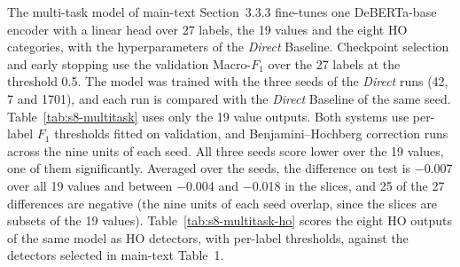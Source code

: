The multi-task model of main-text Section~3.3.3 fine-tunes one DeBERTa-base encoder with a linear head over 27 labels, the 19 values and the eight HO categories, with the hyperparameters of the \emph{Direct} Baseline. Checkpoint selection and early stopping use the validation Macro-$F_1$ over the 27 labels at the threshold 0.5. The model was trained with the three seeds of the \emph{Direct} runs (42, 7 and 1701), and each run is compared with the \emph{Direct} Baseline of the same seed. Table~\ref{tab:s8-multitask} uses only the 19 value outputs. Both systems use per-label $F_1$ thresholds fitted on validation, and Benjamini--Hochberg correction runs across the nine units of each seed. All three seeds score lower over the 19 values, one of them significantly. Averaged over the seeds, the difference on test is $-$0.007 over all 19 values and between $-$0.004 and $-$0.018 in the slices, and 25 of the 27 differences are negative (the nine units of each seed overlap, since the slices are subsets of the 19 values). Table~\ref{tab:s8-multitask-ho} scores the eight HO outputs of the same model as HO detectors, with per-label thresholds, against the detectors selected in main-text Table~1.

